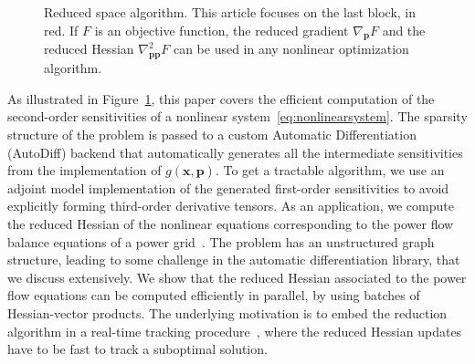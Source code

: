 \begin{figure}
    \centering
    \caption{
      Reduced space algorithm. This article focuses on the last block, in red.
      If $F$ is an objective function,
      the reduced gradient $\nabla_{\bm{p}} F$ and the reduced Hessian $\nabla^2_{\bm{p}\bm{p}} F$
      can be used in any nonlinear optimization algorithm.
    }
    \label{fig:overview}
\end{figure}
As illustrated in Figure~\ref{fig:overview},
this paper covers the efficient computation of the
second-order sensitivities of a nonlinear system~\eqref{eq:nonlinearsystem}. The sparsity structure of the problem is passed to a custom Automatic Differentiation (AutoDiff) backend that automatically generates
all the intermediate sensitivities from the implementation of $g(\bm{x},\bm{p})$. To get a tractable
algorithm, we use an adjoint model implementation of the generated
first-order sensitivities to avoid explicitly forming third-order derivative tensors.
As an application, we compute the reduced Hessian of
the nonlinear equations corresponding to the power flow balance equations of a power grid~\cite{tinney1967power}.
The problem has an unstructured graph structure, leading
to some challenge in the automatic differentiation library, that we discuss extensively.
We show that the reduced Hessian associated to the power flow
equations can be computed efficiently in parallel, by using batches of
Hessian-vector products. The underlying motivation is to embed the reduction
algorithm in a real-time tracking procedure~\cite{tang2017real}, where the reduced Hessian updates
have to be fast to track a suboptimal solution.

